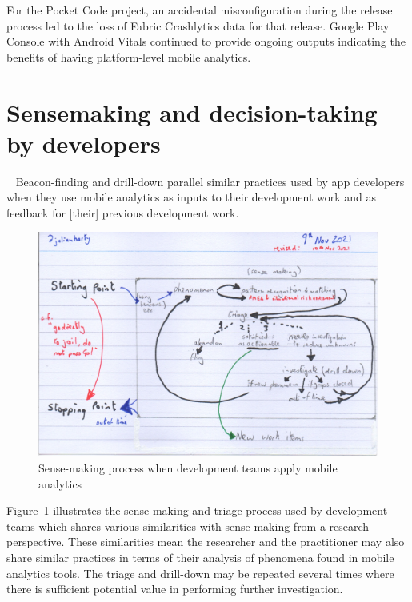 For the Pocket Code project, an accidental misconfiguration during the release process led to the loss of Fabric Crashlytics data for that release. Google Play Console with Android Vitals continued to provide ongoing outputs indicating the benefits of having platform-level mobile analytics.

\section{Sensemaking and decision-taking by developers}~\label{sensemaking-and-decision-taking-by-developers-section}
Beacon-finding and drill-down parallel similar practices used by app developers when they use mobile analytics as inputs to their development work and as feedback for [their] previous development work.

\begin{figure}
    \centering
    \includegraphics[width=15cm]{images/rough-sketches/practical-sense-making-process-10-nov-2021.jpeg}
    \caption{Sense-making process when development teams apply mobile analytics}
    \label{fig:practical-sense-making-process-when-dev-teams-apply-mobile-analytics}
\end{figure}


Figure~\ref{fig:practical-sense-making-process-when-dev-teams-apply-mobile-analytics} illustrates the sense-making and triage process used by development teams which shares various similarities with sense-making from a research perspective. These similarities mean the researcher and the practitioner may also share similar practices in terms of their analysis of phenomena found in mobile analytics tools. The triage and drill-down may be repeated several times where there is sufficient potential value in performing further investigation. 

